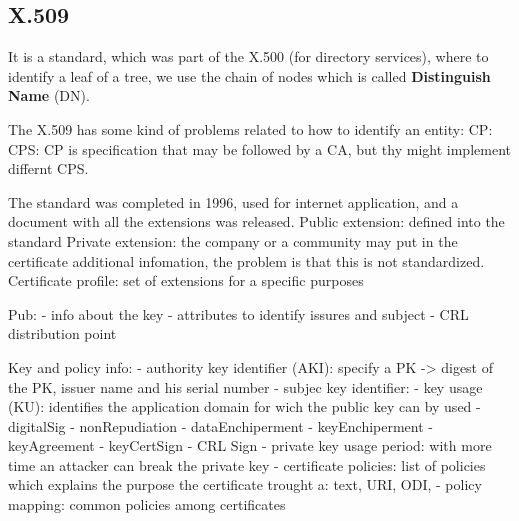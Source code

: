 \documentclass[12pt]{article}
\begin{document}
\subsection{X.509}
It is a standard, which was part of the X.500 (for directory services), where to identify a leaf of a tree, we use the chain of nodes which is called \textbf{Distinguish Name} (DN).

The X.509 has some kind of problems related to how to identify an entity:
CP:
CPS:
CP is specification that may be followed by a CA, but thy might implement differnt CPS.

The standard was completed in 1996, used for internet application, and a document with all the extensions was released. 
Public extension: defined into the standard 
Private extension: the company or a community may put in the certificate additional infomation, the problem is that this is not standardized.
Certificate profile: set of extensions for a specific purposes

Pub:
- info about the key 
- attributes to identify issures and subject
- CRL distribution point 

Key and policy info:
- authority key identifier (AKI): specify a PK -> digest of the PK, issuer name and his serial number
- subjec key identifier: 
- key usage (KU): identifies the application domain for wich the public key can by used 
  - digitalSig
  - nonRepudiation 
  - dataEnchiperment
  - keyEnchiperment
  - keyAgreement
  - keyCertSign
  - CRL Sign
- private key usage period: with more time an attacker can break the private key
- certificate policies: list of policies which explains the purpose the certificate trought a: text, URI, ODI,
- policy mapping: common policies among certificates
\end{document}

